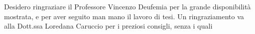 Desidero ringraziare il Professore Vincenzo Deufemia per la grande disponibilità mostrata, e per aver seguito man mano il lavoro di tesi. 
Un ringraziamento va alla Dott.ssa Loredana Caruccio per i preziosi consigli, senza i quali